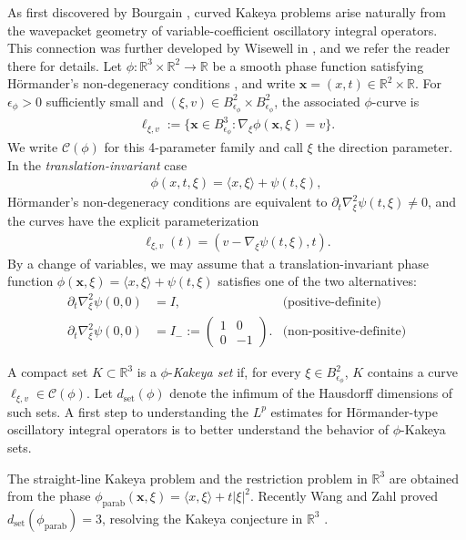 \documentclass[12pt]{amsart}
\newcommand{\x}{{\bf{x}}}
\numberwithin{equation}{section}
\newcommand{\eps}{\epsilon}
\newcommand{\R}{\mathbb{R}}
\newcommand{\1}{\mathbbm{1}}
\renewcommand{\x}{\mathbf x}
\begin{document}
As first discovered by Bourgain \cite{BourgainSeveralVariables}, curved Kakeya problems arise naturally from the wavepacket geometry of variable-coefficient oscillatory integral operators. This connection was further developed by Wisewell in \cite{Wisewell}, and we refer the reader there for details. 
Let $\phi : \R^3 \times \R^2 \to \R$ be a smooth phase function satisfying H\"ormander's non-degeneracy conditions \cite{HormanderOriginal}, and write $\x = (x,t) \in \R^2 \times \R$. For $\eps_\phi > 0$ sufficiently small and $(\xi,v) \in B_{\eps_\phi}^2 \times B_{\eps_{\phi}}^2$, the associated $\phi$-curve is 
\begin{align}
    \ell_{\xi,v} := \{\x \in B_{\eps_\phi}^3 : \nabla_\xi \phi(\x, \xi) = v\}.
\end{align}
We write $\mathcal C(\phi)$ for this 4-parameter family and call $\xi$ the direction parameter. In the \emph{translation-invariant} case 
\begin{align}
    \phi(x,t,\xi) = \langle x,\xi \rangle + \psi(t,\xi),
\end{align}
H\"ormander's non-degeneracy conditions are equivalent to $\partial_t \nabla_\xi^2 \psi(t,\xi) \neq 0$, and
the curves have the explicit parameterization 
\begin{align}
    \ell_{\xi,v}(t) = (v - \nabla_\xi \psi(t,\xi),t).
\end{align}
By a change of variables, we may assume that 
a translation-invariant phase function $\phi(\x,\xi) = \langle x, \xi \rangle + \psi(t,\xi)$ satisfies one of the two alternatives:
\begin{align}
    \partial_t \nabla_\xi^2 \psi(0,0) &= I, \ &\text{(positive-definite)} \\
    \partial_t \nabla_\xi^2 \psi(0,0) &=I_-:= \begin{pmatrix}
        1 & 0 \\
        0 & -1
    \end{pmatrix}. &\text{(non-positive-definite)}
\end{align}


A compact set $K \subset \R^3$ is a $\phi$-\emph{Kakeya set} if, for every $\xi \in B_{\eps_{\phi}
}^2$, $K$ contains a curve $\ell_{\xi,v} \in \mathcal C(\phi)$. Let $d_{\mathrm{set}}(\phi)$ denote the infimum of the Hausdorff dimensions of such sets. A first step to understanding the $L^p$ estimates for H\"ormander-type oscillatory integral operators is to better understand the behavior of $\phi$-Kakeya sets.

The straight-line Kakeya problem and the restriction problem in $\R^3$ are obtained from the phase $\phi_{\mathrm{parab}}(\x,\xi) = \langle x,\xi\rangle + t |\xi|^2$. Recently Wang and Zahl proved $d_{\mathrm{set}}(\phi_{\mathrm{parab}})=3$, resolving the Kakeya conjecture in $\R^3$ \cite{wangKakeya}. 
\end{document}

